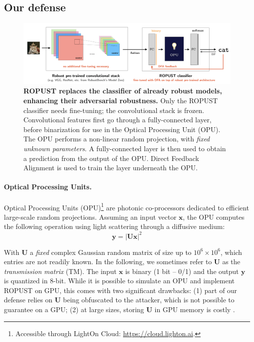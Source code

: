 \subsection{Our defense}\label{sec:defense}
\begin{figure}
    \centering
    \includegraphics[width=\textwidth]{sections/appendix/ropust_icassp2022/ropust.png}
    \caption{\textbf{ROPUST replaces the classifier of already robust models, enhancing their adversarial robustness.} Only the ROPUST classifier needs fine-tuning; the convolutional stack is frozen. Convolutional features first go through a fully-connected layer, before binarization for use in the Optical Processing Unit (OPU). The OPU performs a non-linear random projection, with \emph{fixed unknown parameters}. A fully-connected layer is then used to obtain a prediction from the output of the OPU. Direct Feedback Alignment is used to train the layer underneath the OPU.}
    \label{fig:ropust}
\end{figure}
\paragraph{Optical Processing Units.} Optical Processing Units (OPU)\footnote{Accessible through LightOn Cloud: \url{https://cloud.lighton.ai}.} are photonic co-processors dedicated to efficient large-scale random projections. Assuming an input vector $\mathbf{x}$, the OPU computes the following operation using light scattering through a diffusive medium:
\begin{equation}\label{eq:opu}
    \mathbf{y} = \lvert \mathbf{Ux}\rvert^2
\end{equation}

With $\textbf{U}$ a \emph{fixed} complex Gaussian random matrix of size up to $10^6\times 10^6$, which entries are not readily known. In the following, we sometimes refer to $\mathbf{U}$ as the \emph{transmission matrix} (TM). The input $\textbf{x}$ is binary (1 bit -- 0/1) and the output $\textbf{y}$ is quantized in 8-bit. While it is possible to simulate an OPU and implement ROPUST on GPU, this comes with two significant drawbacks: (1) part of our defense relies on $\mathbf{U}$ being obfuscated to the attacker, which is not possible to guarantee on a GPU; (2) at large sizes, storing $\mathbf{U}$ in GPU memory is costly \cite{ohana2020kernel}. 

